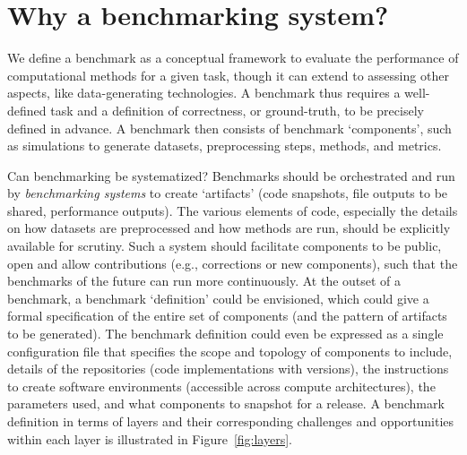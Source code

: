 \documentclass[11pt]{article}
\begin{document}
\section*{Why a benchmarking system?}

We define a benchmark as a conceptual framework to evaluate the performance of computational methods for a given task, though it can extend to assessing other aspects, like data-generating technologies. A benchmark thus requires a well-defined task and a definition of correctness, or ground-truth, to be precisely defined in advance. A benchmark then consists of benchmark `components', such as simulations to generate datasets, preprocessing steps, methods, and metrics. 

Can benchmarking be systematized? Benchmarks should be orchestrated and run by \emph{benchmarking systems} to create `artifacts' (code snapshots, file outputs to be shared, performance outputs).  The various elements of code, especially the details on how datasets are preprocessed and how methods are run, should be explicitly available for scrutiny. Such a system should facilitate components to be public, open and allow contributions (e.g., corrections or new components), such that the benchmarks of the future can run more continuously. At the outset of a benchmark, a benchmark `definition' could be envisioned, which could give a formal specification of the entire set of components (and the pattern of artifacts to be generated). The benchmark definition could even be expressed as a single configuration file that specifies the scope and topology of components to include, details of the repositories (code implementations with versions), the instructions to create software environments (accessible across compute architectures), the parameters used, and what components to snapshot for a release. A benchmark definition in terms of layers and their corresponding challenges and opportunities within each layer is illustrated in Figure~\ref{fig:layers}.
\end{document}
